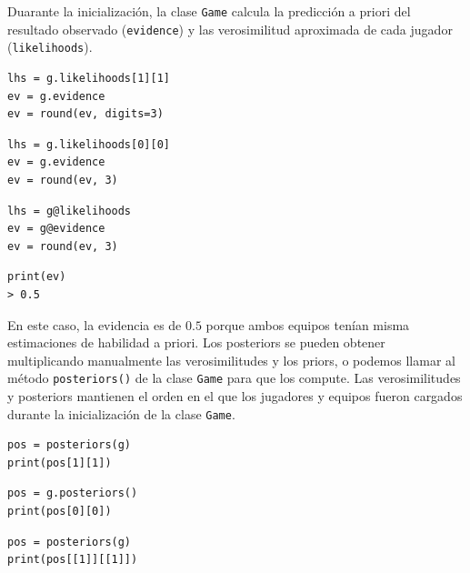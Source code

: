 \documentclass[a4paper,11pt]{book}
\theoremstyle{definition}
\newif\ifen
\newcommand{\en}[1]{\ifen#1\fi}
\begin{document}
%
Duarante la inicializaci\'on, la clase \texttt{Game} calcula la predicci\'on a priori del resultado observado (\texttt{evidence}) y las verosimilitud aproximada de cada jugador (\texttt{likelihoods}).
%
\begin{paracol}{3}
\begin{lstlisting}[backgroundcolor=\color{julia!60},belowskip=0cm]
lhs = g.likelihoods[1][1]
ev = g.evidence
ev = round(ev, digits=3)
\end{lstlisting}
  \switchcolumn
\begin{lstlisting}[backgroundcolor=\color{python!60},belowskip=0cm]
lhs = g.likelihoods[0][0]
ev = g.evidence
ev = round(ev, 3)
\end{lstlisting}
   \switchcolumn
\begin{lstlisting}[backgroundcolor=\color{r!50},belowskip=0cm]
lhs = g@likelihoods
ev = g@evidence
ev = round(ev, 3)
\end{lstlisting}
\end{paracol}
\begin{lstlisting}[captionpos=b,backgroundcolor=\color{all},label=lst:evidence_likelihoods,caption={Consulta de la evidencia y las verosimilitudes},aboveskip=0cm,belowskip=0cm]
print(ev)
> 0.5
\end{lstlisting}
%
En este caso, la evidencia es de $0.5$ porque ambos equipos ten\'ian misma estimaciones de habilidad a priori.
%
Los posteriors se pueden obtener multiplicando manualmente las verosimilitudes y los priors, o podemos llamar al m\'etodo \texttt{posteriors()} de la clase \texttt{Game} para que los compute.
%
Las verosimilitudes y posteriors mantienen el orden en el que los jugadores y equipos fueron cargados durante la inicializaci\'on de la clase \texttt{Game}.
%
\begin{paracol}{3}
\begin{lstlisting}[backgroundcolor=\color{julia!60}, belowskip=-0.77 \baselineskip]
pos = posteriors(g)
print(pos[1][1])
\end{lstlisting}
  \switchcolumn
\begin{lstlisting}[backgroundcolor=\color{python!60}, belowskip=-0.77 \baselineskip]
pos = g.posteriors()
print(pos[0][0])
\end{lstlisting}
   \switchcolumn
\begin{lstlisting}[backgroundcolor=\color{r!50}, belowskip=-0.77 \baselineskip]
pos = posteriors(g)
print(pos[[1]][[1]])
\end{lstlisting}
\end{paracol}
\end{document}
